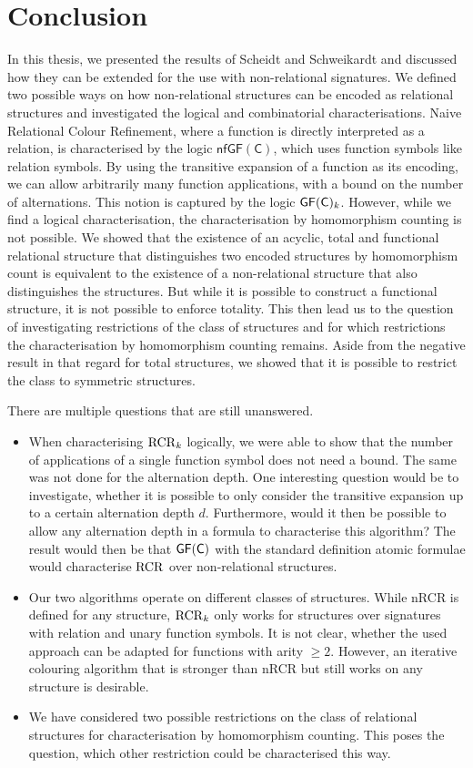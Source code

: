 \section{Conclusion}

In this thesis, we presented the results of Scheidt and Schweikardt \cite{scheidt2025ColorRefinement} and discussed how they can be extended for the use with non-relational signatures.
We defined two possible ways on how non-relational structures can be encoded as relational structures and investigated the logical and combinatorial characterisations.
Naive Relational Colour Refinement, where a function is directly interpreted as a relation, is characterised by the logic $\mathsf{nfGF}(\mathsf C)$, which uses function symbols like relation symbols.
By using the transitive expansion of a function as its encoding, we can allow arbitrarily many function applications, with a bound on the number of alternations. 
This notion is captured by the logic $\mathsf{GF}(\mathsf{C})_k$.
However, while we find a logical characterisation, the characterisation by homomorphism counting is not possible.
We showed that the existence of an acyclic, total and functional relational structure that distinguishes two encoded structures by homomorphism count is equivalent to the existence of a non-relational structure that also distinguishes the structures.
But while it is possible to construct a functional structure, it is not possible to enforce totality.
This then lead us to the question of investigating restrictions of the class of structures and for which restrictions the characterisation by homomorphism counting remains.
Aside from the negative result in that regard for total structures, we showed that it is possible to restrict the class to symmetric structures.

There are multiple questions that are still unanswered.
\begin{itemize}
	\item When characterising $\operatorname{RCR}_k$ logically, we were able to show that the number of applications of a single function symbol does not need a bound.
	The same was not done for the alternation depth.
	One interesting question would be to investigate, whether it is possible to only consider the transitive expansion up to a certain alternation depth $d$.
	Furthermore, would it then be possible to allow any alternation depth in a formula to characterise this algorithm?
	The result would then be that $\mathsf{GF}(\mathsf{C})$ with the standard definition atomic formulae would characterise $\operatorname{RCR}$ over non-relational structures.
	\item Our two algorithms operate on different classes of structures.
	While nRCR is defined for any structure, $\operatorname{RCR}_k$ only works for structures over signatures with relation and unary function symbols.
	It is not clear, whether the used approach can be adapted for functions with arity $\geq 2$.
	However, an iterative colouring algorithm that is stronger than nRCR but still works on any structure is desirable.
	\item We have considered two possible restrictions on the class of relational structures for characterisation by homomorphism counting.
	This poses the question, which other restriction could be characterised this way.
\end{itemize}

